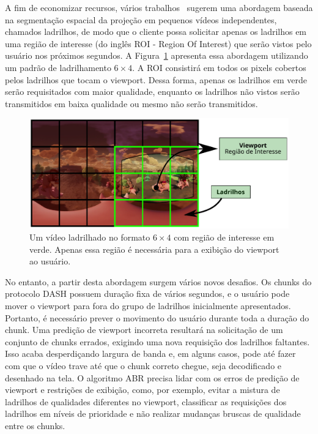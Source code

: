 A fim de economizar recursos, vários trabalhos~\cite{Alface2012, Zare2016, Qian2018, Liu2017, Graf2017, Xiao2018, Nasrabadi2019} sugerem uma abordagem baseada na segmentação espacial da projeção em pequenos vídeos independentes, chamados ladrilhos, de modo que o cliente possa solicitar apenas os ladrilhos em uma região de interesse (do inglês ROI - Region Of Interest) que serão vistos pelo usuário nos próximos segundos. A Figura~\ref{fig:viewport2} apresenta essa abordagem utilizando um padrão de ladrilhamento $6 \times 4$. A ROI consistirá em todos os pixels cobertos pelos ladrilhos que tocam o viewport. Dessa forma, apenas os ladrilhos em verde serão requisitados com maior qualidade, enquanto os ladrilhos não vistos serão transmitidos em baixa qualidade ou mesmo não serão transmitidos.

\begin{figure}[h]
	\centering
	\includegraphics[width=0.80\columnwidth]{fig/viewport2.pdf}
	\caption{Um vídeo ladrilhado no formato $6 \times 4$ com região de interesse em verde. Apenas essa região é necessária para a exibição do viewport ao usuário.}
	\label{fig:viewport2}
\end{figure}

No entanto, a partir desta abordagem surgem vários novos desafios. Os chunks do protocolo DASH possuem duração fixa de vários segundos, e o usuário pode mover o viewport para fora do grupo de ladrilhos inicialmente apresentados. Portanto, é necessário prever o movimento do usuário durante toda a duração do chunk. Uma predição de viewport incorreta resultará na solicitação de um conjunto de chunks errados, exigindo uma nova requisição dos ladrilhos faltantes. Isso acaba desperdiçando largura de banda e, em alguns casos, pode até fazer com que o vídeo trave até que o chunk correto chegue, seja decodificado e desenhado na tela. O algoritmo ABR precisa lidar com os erros de predição de viewport e restrições de exibição, como, por exemplo, evitar a mistura de ladrilhos de qualidades diferentes no viewport, classificar as requisições dos ladrilhos em níveis de prioridade e não realizar mudanças bruscas de qualidade entre os chunks.

